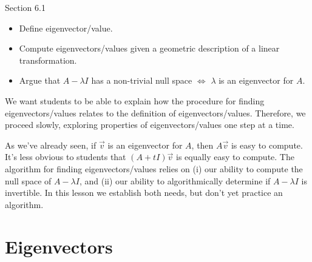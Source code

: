 \documentclass{problemset}
\newcommand{\bookonlynewpage}{\begin{bookonly}\newpage\end{bookonly}}
\begin{document}
\begin{lesson}

	Section 6.1

	\begin{itemize}
		\item Define eigenvector/value.
		\item Compute eigenvectors/values given a geometric description of a linear transformation.
		\item Argue that $A-\lambda I$ has a non-trivial null space $\iff$ $\lambda$ is an eigenvector for $A$.
	\end{itemize}

	We want students to be able to explain how the procedure for finding eigenvectors/values
	relates to the definition of eigenvectors/values. Therefore, we proceed slowly, exploring
	properties of eigenvectors/values one step at a time.

	As we've already seen, if $\vec v$ is an eigenvector for $A$, then $A\vec v$ is easy to compute.
	It's less obvious to students that $(A+tI)\vec v$ is equally easy to compute. 
	The algorithm for
	finding eigenvectors/values relies on (i) our ability to compute the null space of $A-\lambda I$,
	and (ii) our ability to algorithmically determine if $A-\lambda I$ is invertible. In this lesson we
	establish both needs, but don't yet practice an algorithm.


\end{lesson}
	\bookonlynewpage
\section*{Eigenvectors}

\end{document}
